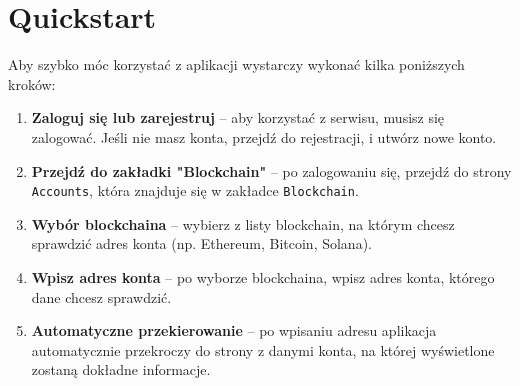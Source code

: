 \section{Quickstart}

Aby szybko móc korzystać  z aplikacji wystarczy wykonać kilka poniższych kroków:

\begin{enumerate}

   \item \textbf{Zaloguj się lub zarejestruj} -- aby korzystać z serwisu, musisz się zalogować. Jeśli nie masz konta, przejdź do rejestracji, i utwórz  nowe konto.


   \item \textbf{Przejdź do zakładki "Blockchain"} -- po zalogowaniu się, przejdź do strony \texttt{Accounts}, która znajduje się w zakładce \texttt{Blockchain}.


   \item \textbf{Wybór blockchaina} -- wybierz z listy blockchain, na którym chcesz sprawdzić adres konta (np. Ethereum, Bitcoin, Solana).


   \item \textbf{Wpisz adres konta} -- po wyborze blockchaina, wpisz adres konta, którego dane chcesz sprawdzić. 

   \item \textbf{Automatyczne przekierowanie} -- po wpisaniu adresu aplikacja automatycznie przekroczy do strony z danymi konta, na której wyświetlone zostaną dokładne informacje.

\end{enumerate}
